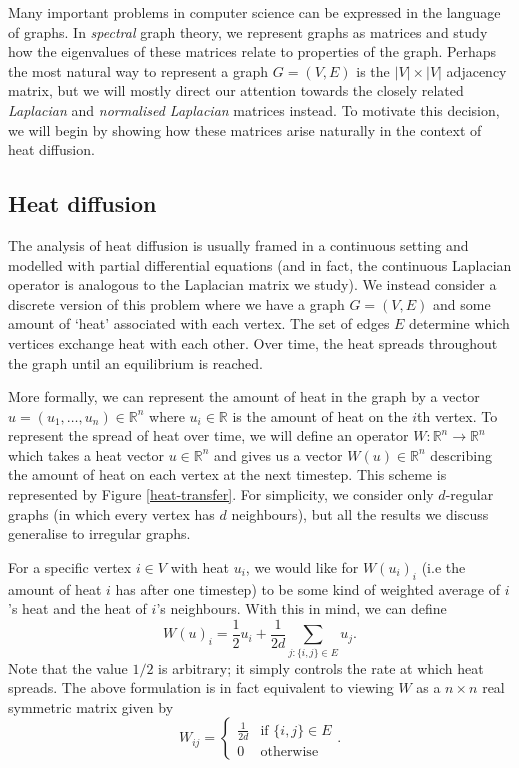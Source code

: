 \documentclass[a4paper,11pt]{article}
\theoremstyle{definition}
\newcommand{\R}{\mathbb{R}}
\begin{document}
\medskip

Many important problems in computer science can be expressed in the language of graphs. In \emph{spectral} graph theory, we represent graphs as matrices and study how the eigenvalues of these matrices relate to properties of the graph. Perhaps the most natural way to represent a graph $G = (V, E)$ is the $|V| \times |V|$ adjacency matrix, but we will mostly direct our attention towards the closely related \emph{Laplacian} and \emph{normalised Laplacian} matrices instead. To motivate this decision, we will begin by showing how these matrices arise naturally in the context of heat diffusion.

\subsection{Heat diffusion}

The analysis of heat diffusion is usually framed in a continuous setting and modelled with partial differential equations (and in fact, the continuous Laplacian operator is analogous to the Laplacian matrix we study). We instead consider a discrete version of this problem where we have a graph $G = (V, E)$ and some amount of `heat' associated with each vertex. The set of edges $E$ determine which vertices exchange heat with each other. Over time, the heat spreads throughout the graph until an equilibrium is reached. 

\medskip

More formally, we can represent the amount of heat in the graph by a vector $u = (u_1, \dots, u_n) \in \R^n$ where $u_i \in \R$ is the amount of heat on the $i$th vertex. To represent the spread of heat over time, we will define an operator $W: \R^n \to \R^n$ which takes a heat vector $u \in \R^n$ and gives us a vector $W(u) \in \R^n$ describing the amount of heat on each vertex at the next timestep. This scheme is represented by Figure \ref{heat-transfer}. For simplicity, we consider only $d$-regular graphs (in which every vertex has $d$ neighbours), but all the results we discuss generalise to irregular graphs.

\medskip

For a specific vertex $i \in V$ with heat $u_i$, we would like for $W(u_i)_i$ (i.e the amount of heat $i$ has after one timestep) to be some kind of weighted average of $i$'s heat and the heat of $i$'s neighbours. With this in mind, we can define
\[
W(u)_i = \frac{1}{2}u_i + \frac{1}{2d} \sum_{j : \{i, j\} \in E} u_j.
\]
Note that the value $1/2$ is arbitrary; it simply controls the rate at which heat spreads. The above formulation is in fact equivalent to viewing $W$ as a $n \times n$ real symmetric matrix given by
\[
W_{ij} = \begin{cases}
\frac{1}{2d} &\text{if } \{i, j\} \in E \\
0 &\text{otherwise}
\end{cases}.
\]
\end{document}
